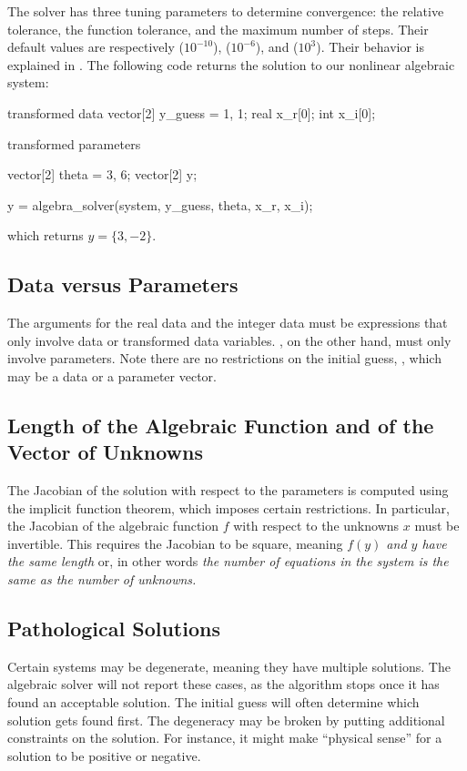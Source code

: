 The solver has three tuning parameters to determine convergence: the relative tolerance,
the function tolerance, and the maximum number of steps. Their default values are respectively
 ($10^{-10}$),  ($10^{-6}$), and  ($10^3$). Their
behavior is explained in .
%
The following code returns the solution to our nonlinear algebraic system:
%
\begin{stancode}
transformed data {
  vector[2] y_guess = {1, 1};
  real x_r[0];
  int x_i[0];
}

transformed parameters {
  vector[2] theta = {3, 6};
  vector[2] y;

  y = algebra_solver(system, y_guess, theta, x_r, x_i);
}
\end{stancode}

which returns $y = \{3, -2\}$.

\subsection{Data versus Parameters}
The arguments for the real data  and
the integer data  must be expressions that only involve data or
transformed data variables. , on the other hand,
must only involve parameters. Note there are no restrictions on the initial guess,
, which may be a data or a parameter vector.

\subsection{Length of the Algebraic Function and of the Vector of Unknowns}
The Jacobian of the solution with respect to the parameters is computed
using the implicit function theorem, which imposes certain restrictions. In particular,
the Jacobian of the algebraic function $f$ with respect to the unknowns $x$ must
be invertible. This requires the Jacobian to be square, meaning \textit{$f(y)$ and
$y$ have the same length} or, in other words \textit{the number of equations in
the system is the same as the number of unknowns.}

\subsection{Pathological Solutions}
Certain systems may be degenerate, meaning they have multiple solutions. The
algebraic solver will not report these cases, as the algorithm stops once it has found
an acceptable solution. The initial guess will often determine which solution gets found
first. The degeneracy may be broken by putting additional constraints on the solution.
For instance, it might make ``physical sense'' for a solution to be positive or negative.

